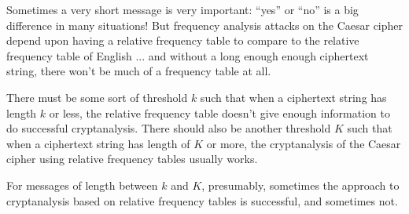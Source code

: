 \documentclass[12pt,letterpaper]{amsbook}
\theoremstyle{definition}
\theoremstyle{remark}
\numberwithin{figure}{section}
\numberwithin{exercise}{chapter}
\numberwithin{section}{chapter}
\numberwithin{equation}{section}
\numberwithin{table}{subsection}
\begin{document}
Sometimes a very short message is very important: ``yes'' or ``no'' is a big
difference in many situations!  But frequency analysis attacks on the Caesar
cipher depend upon having a relative frequency table to compare to the relative
frequency table of English ... and without a long enough enough ciphertext
string, there won't be much of a frequency table at all.

There must be some sort of threshold $k$ such that when a ciphertext string
has length $k$ or less, the relative frequency table doesn't give enough
information to do successful cryptanalysis.
There should also be another threshold $K$ such that when a ciphertext string
has length of $K$ or more, the cryptanalysis of the Caesar cipher using
relative frequency tables usually works.

For messages of length between $k$ and $K$, presumably, sometimes the approach
to cryptanalysis based on relative frequency tables is successful, and
sometimes not.
\end{document}
